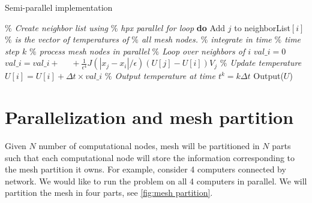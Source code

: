 \documentclass[11pt,twocolumn]{amsart}
\theoremstyle{definition}
\theoremstyle{definition}
\numberwithin{equation}{section}
\numberwithin{equation}{section}
\begin{document}
\begin{algorithm}[ht]
	\caption{Semi-parallel implementation}
	\label{alg:semi parallel}
	\begin{algorithmic}[1]
		\STATE \textcolor{mygray}{\it $\%$ Create neighbor list using }
		\STATE \textcolor{mygray}{\it $\%$ hpx parallel for loop}
		 \textbf{do}
				\STATE Add $j$ to neighborList$[i]$
			\ENDIF
		\EndHloop
		\STATE
		\STATE \textcolor{mygray}{\it $\%$ is the vector of temperatures of}
		\STATE \textcolor{mygray}{\it $\%$ all mesh nodes. }
		\STATE
		\STATE \textcolor{mygray}{\it $\%$ integrate in time}
			\STATE \textcolor{mygray}{\it $\%$ time step $k$}
			\STATE \textcolor{mygray}{\it $\%$ process mesh nodes in parallel}
				\STATE  \textcolor{mygray}{\it $\%$ Loop over neighbors of $i$}
				\STATE $val\_i = 0$
					\STATE $val\_i = val\_i + $
					\STATE $\quad +  \frac{1}{\epsilon^4} J(|x_j - x_i|/\epsilon) (U[j] - U[i])V_j$
				\ENDFOR
				\STATE \textcolor{mygray}{\it $\%$ Update temperature}
				\STATE $U[i] = U[i] + \Delta t \times val\_i$
			\EndHloop	
			\STATE \textcolor{mygray}{\it $\%$ Output temperature at time $t^k = k\Delta t$}
			\STATE Output($U$)
		\ENDFOR
	\end{algorithmic}
\end{algorithm}

\section{Parallelization and mesh partition}
Given $N$ number of computational nodes, mesh will be partitioned in $N$ parts such that each computational node will store the information corresponding to the mesh partition it owns. For example, consider 4 computers connected by network. We would like to run the problem on all 4 computers in parallel. We will partition the mesh in four parts, see \autoref{fig:mesh partition}.
\end{document}

